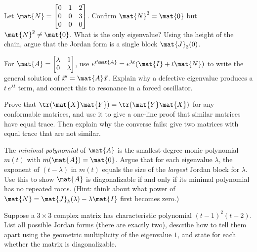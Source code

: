 \begin{exercise}
\label{ch28:ex-nilpotent}
Let $\mat{N}=\begin{bmatrix}0&1&2\\0&0&3\\0&0&0\end{bmatrix}$. Confirm $\mat{N}^3=\mat{0}$
but $\mat{N}^2\neq\mat{0}$. What is the only eigenvalue? Using the height of the chain,
argue that the Jordan form is a single block $\mat{J}_3(0)$.
\end{exercise}

\begin{exercise}
\label{ch28:ex-ode}
For $\mat{A}=\begin{bmatrix}\lambda&1\\0&\lambda\end{bmatrix}$, use
$e^{t\mat{A}}=e^{\lambda t}(\mat{I}+t\mat{N})$ to write the general solution of
$\vec{x}'=\mat{A}\vec{x}$. Explain why a defective eigenvalue produces a
$t\,e^{\lambda t}$ term, and connect this to resonance in a forced oscillator.
\end{exercise}

\begin{exercise}
\label{ch28:ex-trace-proof}
Prove that $\tr(\mat{X}\mat{Y})=\tr(\mat{Y}\mat{X})$ for any conformable matrices, and use
it to give a one-line proof that similar matrices have equal trace. Then explain why the
converse fails: give two matrices with equal trace that are not similar.
\end{exercise}

\begin{exercise}
\label{ch28:ex-minpoly}
The \emph{minimal polynomial} of $\mat{A}$ is the smallest-degree monic polynomial $m(t)$
with $m(\mat{A})=\mat{0}$. Argue that for each eigenvalue $\lambda$, the exponent of
$(t-\lambda)$ in $m(t)$ equals the size of the \emph{largest} Jordan block for $\lambda$.
Use this to show $\mat{A}$ is diagonalizable if and only if its minimal polynomial has no
repeated roots. (Hint: think about what power of $\mat{N}=\mat{J}_k(\lambda)-\lambda\mat{I}$
first becomes zero.)
\end{exercise}

\begin{exercise}
\label{ch28:ex-classify}
Suppose a $3\times3$ complex matrix has characteristic polynomial $(t-1)^2(t-2)$. List
all possible Jordan forms (there are exactly two), describe how to tell them apart using
the geometric multiplicity of the eigenvalue $1$, and state for each whether the matrix is
diagonalizable.
\end{exercise}

